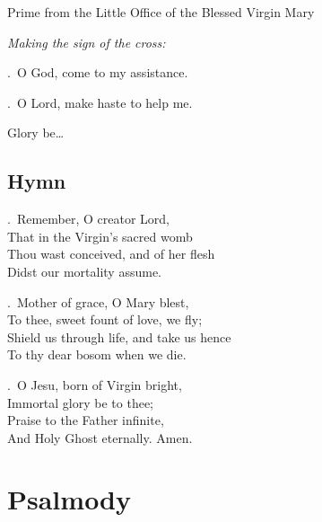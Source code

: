 \documentclass[12pt,a5paper]{memoir}
\newcommand{\rubrics}[1]{\noindent\textit{#1}}
\begin{document}
%
%
%


\begin{centering}


\Huge \vectis Prime \large from the Little Office of the Blessed Virgin Mary

\end{centering}

\bigskip

\rubrics{Making the sign of the cross:}


\bigskip

\Vbar.\ O God, come to my assistance.

\Rbar.\ O Lord, make haste to help me.

Glory be\ldots

\newpage

\subsection{Hymn}


\begin{multicols}{2}

.\ Remember, O creator Lord,\\
That in the Virgin's sacred womb\\
Thou wast conceived, and of her flesh\\
Didst our mortality assume.

\smallskip 

.\ Mother of grace, O Mary blest,\\
To thee, sweet fount of love, we fly;\\
Shield us through life, and take us hence\\
To thy dear bosom when we die.

\smallskip

.\ O Jesu, born of Virgin bright,\\
Immortal glory be to thee;\\
Praise to the Father infinite,\\
And Holy Ghost eternally. Amen.

\end{multicols}


\newpage

\section*{Psalmody}
\end{document}

